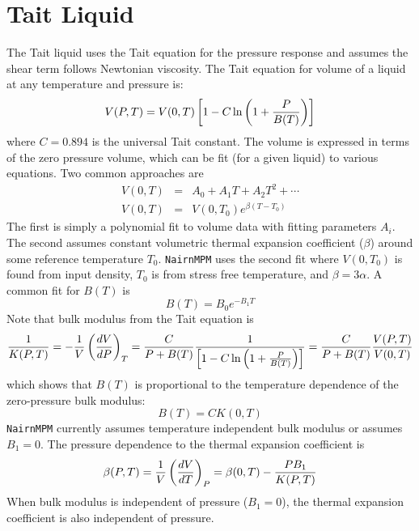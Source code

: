 \documentclass[11pt]{book}
\begin{document}
\section{Tait Liquid}

The Tait liquid uses the Tait equation for the pressure response and assumes the shear term follows Newtonian viscosity. The Tait equation for volume of a liquid at any temperature and pressure is:
\begin{equation}
    V(P,T) = V(0,T)\left[1-C\ln\left(1+{P\over B(T)}\right)\right]
\end{equation}
where $C=0.894$ is the universal Tait constant. The volume is expressed in terms of the zero pressure volume, which can be fit (for a given liquid) to various equations. Two common approaches are
\begin{eqnarray}
      V(0,T) & = & A_0 + A_1T + A_2 T^2 +\cdots \\
      V(0,T) & = & V(0,T_{0})e^{\beta(T-T_{0})}
\end{eqnarray}
The first is simply a polynomial fit to volume data with fitting parameters $A_i$. The second assumes constant volumetric thermal expansion coefficient ($\beta$) around some reference temperature $T_{0}$. {\tt NairnMPM} uses the second fit where $V(0,T_{0})$ is found from input density, $T_{0}$ is from stress free temperature, and $\beta = 3\alpha$. A common fit for $B(T)$ is
\begin{equation}
     B(T) = B_0 e^{-B_1T}
\end{equation}
Note that bulk modulus from the Tait equation is
\begin{equation}
    {1\over K(P,T)} = -{1\over V}\left({dV\over dP}\right)_T = {C\over P+B(T)} {1\over \left[1-C\ln\left(1+{P\over B(T)}\right)\right]} = {C\over P+B(T)} { V(P,T)\over  V(0,T)}
\end{equation}
which shows that $B(T)$ is proportional to the temperature dependence of the zero-pressure bulk modulus:
\begin{equation}
     B(T) = C K(0,T) 
\end{equation}
{\tt NairnMPM} currently assumes temperature independent bulk modulus or assumes $B_1=0$. The pressure dependence to the thermal expansion coefficient is
\begin{equation}
   \beta(P,T) =  {1\over V}\left({dV\over dT}\right)_P= \beta(0,T) - {PB_1\over K(P,T)}
\end{equation}
When bulk modulus is independent of pressure ($B_1=0$), the thermal expansion coefficient is also independent of pressure.
\end{document}
